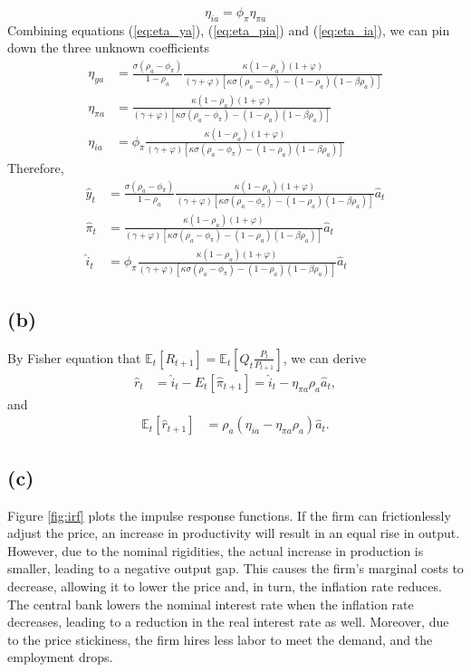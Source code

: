 \documentclass[12pt]{article}
\newcommand{\E}{\mathbb{E}}
\begin{document}
\begin{equation}
\label{eq:eta_ia}
\eta_{ia} = \phi_{\pi}\eta_{\pi a}
\end{equation}
Combining equations (\ref{eq:eta_ya}), (\ref{eq:eta_pia}) and (\ref{eq:eta_ia}),
we can pin down the three unknown coefficients
\newcommand{\etapia}{\frac{\kappa\left(1-\rho_{a}\right)\left(1+\varphi\right)}{\left(\gamma+\varphi\right)\left[\kappa\sigma\left(\rho_{a}-\phi_{\pi}\right)-\left(1-\rho_{a}\right)\left(1-\beta\rho_{a}\right)\right]}}
\begin{align*}
\eta_{ya} &= \frac{\sigma\left(\rho_{a}-\phi_{\pi}\right)}{1-\rho_{a}} \etapia \\
\eta_{\pi a} &= \etapia \\
\eta_{ia} &= \phi_{\pi}\etapia 
\end{align*}
Therefore, 
\begin{align*}
\hat{y}_{t} &= \frac{\sigma\left(\rho_{a}-\phi_{\pi}\right)}{1-\rho_{a}} \etapia \hat{a}_{t} \\
\hat{\pi}_{t} &= \etapia \hat{a}_{t} \\
\hat{i}_{t} &= \phi_{\pi}\etapia \hat{a}_{t}
\end{align*}

\subsection*{(b)}

By Fisher equation that $\E_{t}\left[R_{t+1}\right]=\E_{t}\left[Q_{t}\frac{P_{t}}{P_{t+1}}\right]$, we can derive
\begin{align*}
\hat{r}_{t} &= \hat{i}_{t} - E_{t}\left[\hat{\pi}_{t+1}\right] = \hat{i}_{t} - \eta_{\pi a}\rho_{a}\hat{a}_{t},
\end{align*}
and
\begin{align*}
\E_{t}\left[\hat{r}_{t+1}\right] &= \rho_{a}\left(\eta_{ia} - \eta_{\pi a}\rho_{a}\right) \hat{a}_{t}.
\end{align*}

\subsection*{(c)}

Figure \ref{fig:irf} plots the impulse response functions.
If the firm can frictionlessly adjust the price,
an increase in productivity will result in an equal rise in output. 
However, due to the nominal rigidities, 
the actual increase in production is smaller, 
leading to a negative output gap. 
This causes the firm's marginal costs to decrease, allowing it to lower the price and, in turn, the inflation rate reduces. 
The central bank lowers the nominal interest rate when the inflation rate decreases, 
leading to a reduction in the real interest rate as well.
Moreover, due to the price stickiness, the firm hires less labor to meet the demand, and the employment drops. 
\end{document}
